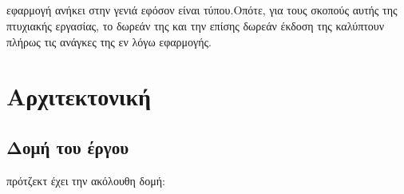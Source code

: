 \subsection*{}
 εφαρμογή ανήκει στην γενιά  εφόσον είναι  τύπου.Οπότε, για τους σκοπούς αυτής της πτυχιακής εργασίας, το δωρεάν  της  και την επίσης δωρεάν έκδοση της  καλύπτουν πλήρως τις ανάγκες της εν λόγω εφαρμογής.
\pagebreak

\section{Αρχιτεκτονική}

\subsection*{Δομή του έργου}
 πρότζεκτ έχει την ακόλουθη δομή:\\

